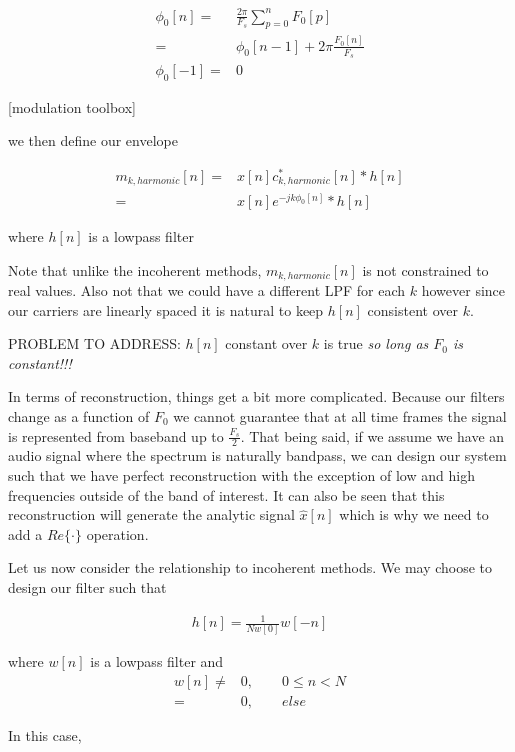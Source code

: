 \documentclass [11pt, proquest] {uwthesis}[2015/03/03]
\begin{document}
\begin{align}
\phi_0[n] =& \frac{2\pi}{F_s} \sum_{p=0}^{n} F_0[p] \nonumber \\
=& \phi_0[n - 1] + 2\pi \frac{F_0[n]}{F_s} \\
\phi_0[-1] =& 0 \nonumber
\end{align}

[modulation toolbox]

we then define our envelope

\begin{align}
m_{k,harmonic}[n] =& x[n] c_{k,harmonic}^*[n] * h[n] \nonumber \\
=& x[n] e^{-jk\phi_0 [n]} * h[n]
\end{align}

where $h[n]$ is a lowpass filter

Note that unlike the incoherent methods, $m_{k,harmonic}[n]$ is not constrained to real values.  Also not that we could have a different LPF for each $k$ however since our carriers are linearly spaced it is natural to keep $h[n]$ consistent over $k$.

PROBLEM TO ADDRESS: $h[n]$ constant over $k$ is true \textit{so long as $F_0$ is constant!!!}

In terms of reconstruction, things get a bit more complicated.  Because our filters change as a function of $F_0$ we cannot guarantee that at all time frames the signal is represented from baseband up to $\frac{F_s}{2}$.  That being said, if we assume we have an audio signal where the spectrum is naturally bandpass, we can design our system such that we have perfect reconstruction with the exception of low and high frequencies outside of the band of interest.  It can also be seen that this reconstruction will generate the analytic signal $\widehat{x}[n]$ which is why we need to add a $Re\{\cdot\}$ operation.

Let us now consider the relationship to incoherent methods.  We may choose to design our filter such that

\begin{align}
h[n] = \frac{1}{Nw[0]} w[-n]
\end{align}

where $w[n]$ is a lowpass filter and 
\begin{align}
w[n] \neq& 0, \qquad 0 \leq n < N \nonumber \\
=& 0, \qquad else
\end{align}

In this case,
\end{document}
